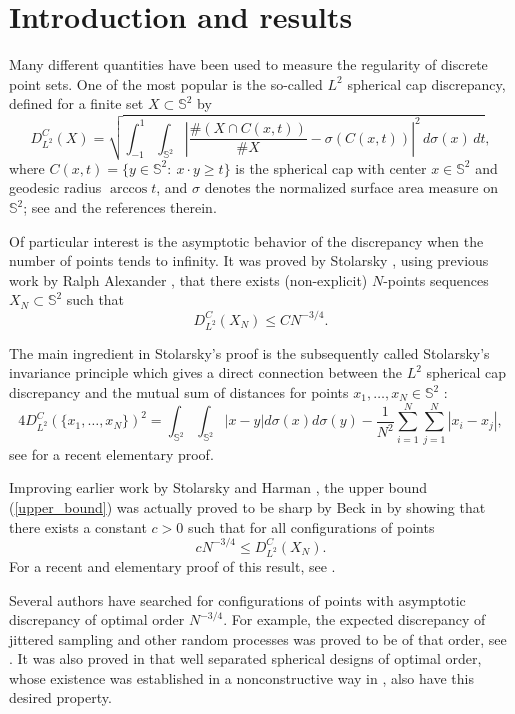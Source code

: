 \documentclass[11pt]{amsart}
\newcommand{\Sph}{\mathbb S^2}
\begin{document}
\section{Introduction and results}

Many different quantities have been used to measure the regularity of discrete point sets. One of the most popular is the so-called $L^2$ spherical cap discrepancy, defined for a finite set $X\subset \Sph$ by
\[ D_{L^2}^C(X)=\sqrt{\int_{-1}^{1}\int_{\Sph}\left| \frac{\#(X\cap C(x,t))}{\#X}-\sigma(C(x,t)) \right|^2\, d\sigma(x)\,dt}, \]
where $C(x,t)=\{ y\in \Sph:\ x\cdot y\ge t \}$ is the spherical cap with center $x\in \Sph$ and geodesic radius $\arccos t$, and $\sigma$ denotes the normalized surface area measure on $\Sph$; see \cite{Beck, DT97, BHS19} and the references therein.

Of  particular interest is the asymptotic behavior of the discrepancy when the number of points tends to infinity. It was proved by Stolarsky \cite{Stolarsky}, using previous work by Ralph Alexander \cite{Alexander1972} , that there exists (non-explicit)
$N$-points sequences $X_N\subset \Sph$ such that
\begin{equation}\label{upper_bound}
D_{L^2}^C(X_N)\le C N^{-3/4}.
\end{equation}

The main ingredient in Stolarsky's proof is the subsequently called Stolarsky's invariance principle which gives a direct connection between the $L^{2}$ spherical cap discrepancy and the mutual sum of distances for points $x_1,\dots, x_N\in \Sph$ \cite{Stolarsky}:
$$4 D_{L^2}^C (\{ x_1,\dots, x_N \})^2=\int_{\Sph}\int_{\Sph}|x-y|d\sigma(x)d\sigma(y)-
\frac{1}{N^2}\sum_{i=1}^N \sum_{j=1}^N |x_i-x_j|,$$
see \cite{BDM18} for a recent elementary proof.

Improving earlier work by Stolarsky \cite{Stolarsky} and Harman \cite{Har82},
the upper bound (\ref{upper_bound}) was actually proved to be sharp by Beck in \cite{Beck} by showing that
there exists a
constant $c>0$ such that for all configurations of points
$$c N^{-3/4}\le D_{L^2}^C(X_N).$$
For a recent and elementary proof of this result, see \cite{BB25}.


Several authors have searched for configurations of points with asymptotic discrepancy of optimal order $N^{-3/4}$. For example, the expected discrepancy of jittered sampling and other random processes was proved to be of that order, see \cite{Beck,AZ15,BGM24}. %
It was also proved in \cite{BSSW14,Skr19} that well separated spherical designs of optimal order, whose existence was established in a nonconstructive way in \cite{BRV13,BRV15}, also have this desired property.
\end{document}
